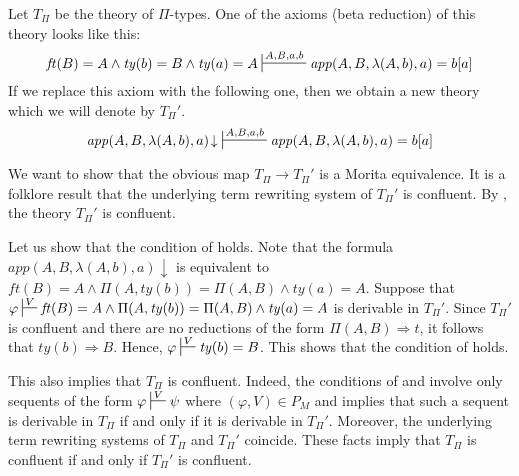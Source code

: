 \documentclass[reqno]{amsart}
\theoremstyle{definition}
\theoremstyle{remark}
\newcommand{\app}{\mathit{app}}
\newcommand{\ft}{\mathit{ft}}
\newcommand{\ty}{\mathit{ty}}
\numberwithin{figure}{section}
\begin{document}
\begin{example}
Let $T_\Pi$ be the theory of $\Pi$-types.
One of the axioms (beta reduction) of this theory looks like this:
\[ \ft(B) = A \land \ty(b) = B \land \ty(a) = A \sststile{}{A,B,a,b} \app(A,B,\lambda(A,b),a) = b[a] \]
If we replace this axiom with the following one, then we obtain a new theory which we will denote by $T_\Pi'$.
\[ \app(A,B,\lambda(A,b),a)\!\downarrow\ \sststile{}{A,B,a,b} \app(A,B,\lambda(A,b),a) = b[a] \]

We want to show that the obvious map $T_\Pi \to T_\Pi'$ is a Morita equivalence.
It is a folklore result that the underlying term rewriting system of $T_\Pi'$ is confluent.
By , the theory $T_\Pi'$ is confluent.

Let us show that the condition of  holds.
Note that the formula $\app(A,B,\lambda(A,b),a)\!\downarrow$ is equivalent to $\ft(B) = A \land \Pi(A,\ty(b)) = \Pi(A,B) \land \ty(a) = A$.
Suppose that $\varphi \sststile{}{V} \ft(B) = A \land \Pi(A,\ty(b)) = \Pi(A,B) \land \ty(a) = A$ is derivable in $T_\Pi'$.
Since $T_\Pi'$ is confluent and there are no reductions of the form $\Pi(A,B) \Rightarrow t$, it follows that $\ty(b) \Rightarrow B$.
Hence, $\varphi \sststile{}{V} \ty(b) = B$.
This shows that the condition of  holds.

This also implies that $T_\Pi$ is confluent.
Indeed, the conditions of  and  involve only sequents of the form $\varphi \sststile{}{V} \psi$ where $(\varphi,V) \in P_M$
and  implies that such a sequent is derivable in $T_\Pi$ if and only if it is derivable in $T_\Pi'$.
Moreover, the underlying term rewriting systems of $T_\Pi$ and $T_\Pi'$ coincide.
These facts imply that $T_\Pi$ is confluent if and only if $T_\Pi'$ is confluent.
\end{example}
\end{document}
